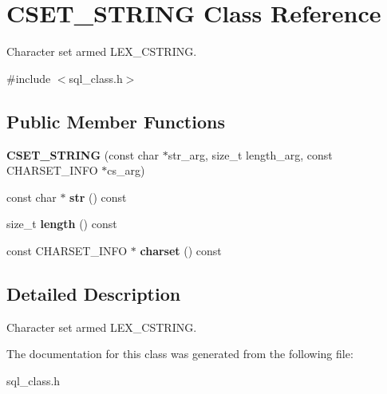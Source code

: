 \hypertarget{classCSET__STRING}{}\section{C\+S\+E\+T\+\_\+\+S\+T\+R\+I\+NG Class Reference}
\label{classCSET__STRING}


Character set armed L\+E\+X\+\_\+\+C\+S\+T\+R\+I\+NG.  




{\ttfamily \#include $<$sql\+\_\+class.\+h$>$}

\subsection*{Public Member Functions}
\begin{DoxyCompactItemize}
\item 
\mbox{\label{classCSET__STRING_a83644cd56cdf93cdceb3ad8b9bea5029}} 
{\bfseries C\+S\+E\+T\+\_\+\+S\+T\+R\+I\+NG} (const char $\ast$str\+\_\+arg, size\+\_\+t length\+\_\+arg, const C\+H\+A\+R\+S\+E\+T\+\_\+\+I\+N\+FO $\ast$cs\+\_\+arg)
\item 
\mbox{\label{classCSET__STRING_abdc0c1d0f87e22987c7747aacb01c3a6}} 
const char $\ast$ {\bfseries str} () const
\item 
\mbox{\label{classCSET__STRING_a2e46ab8f5f4f58086900caf6ea21dd27}} 
size\+\_\+t {\bfseries length} () const
\item 
\mbox{\label{classCSET__STRING_a40a1854371e521435e8a17ece2589f66}} 
const C\+H\+A\+R\+S\+E\+T\+\_\+\+I\+N\+FO $\ast$ {\bfseries charset} () const
\end{DoxyCompactItemize}


\subsection{Detailed Description}
Character set armed L\+E\+X\+\_\+\+C\+S\+T\+R\+I\+NG. 

The documentation for this class was generated from the following file\+:\begin{DoxyCompactItemize}
\item 
sql\+\_\+class.\+h\end{DoxyCompactItemize}
